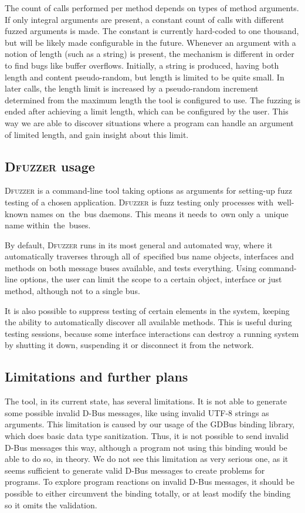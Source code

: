\documentclass[conference]{IEEEtran}
\begin{document}
The count of calls performed per method depends on types of method arguments.
If only integral arguments are present, a constant count of calls with
different fuzzed arguments is made. The constant is currently hard-coded to one
thousand, but will be likely made configurable in the future.  Whenever an
argument with a notion of length (such as a string) is present, the mechanism
is different in order to find bugs like buffer overflows. Initially, a string
is produced, having both length and content pseudo-random, but length is
limited to be quite small. In later calls, the length limit is increased by a
pseudo-random increment determined from the maximum length the tool is
configured to use. The fuzzing is ended after achieving a limit length, which
can be configured by the user. This way we are able to discover situations
where a program can handle an argument of limited length, and gain insight
about this limit.


\subsection{\textsc{Dfuzzer} usage}
\textsc{Dfuzzer} is a command-line tool taking options as arguments for setting-up fuzz
testing of a chosen application. \textsc{Dfuzzer} is fuzz testing only processes
with~well-known names on~the~bus daemons. This means it needs to~own
only a~unique name within~the~buses.


By default, \textsc{Dfuzzer} runs in its most general and automated way, where
it automatically traverses through all of~specified bus name objects, interfaces
and methods on both message buses available, and tests everything. Using
command-line options, the user can limit the scope to a certain object,
interface or just method, although not to a single bus.


It is also possible to suppress testing of certain elements in the system,
keeping the ability to automatically discover all available methods. This is
useful during testing sessions, because some interface interactions can
destroy a running system by shutting it down, suspending it or disconnect it
from the network.

\subsection{Limitations and further plans}
The tool, in its current state, has several limitations. It is not able to generate some possible invalid D-Bus
messages, like using invalid UTF-8 strings as arguments. This limitation is
caused by our usage of the GDBus binding library, which does basic data type
sanitization. Thus, it is not possible to send invalid D-Bus messages this way,
although a program not using this binding would be able to do so, in theory. We
do not see this limitation as very serious one, as it seems sufficient to
generate valid D-Bus messages to create problems for programs. To explore
program reactions on invalid D-Bus messages, it should be possible to either
circumvent the binding totally, or at least modify the binding so it omits the
validation.
\end{document}
